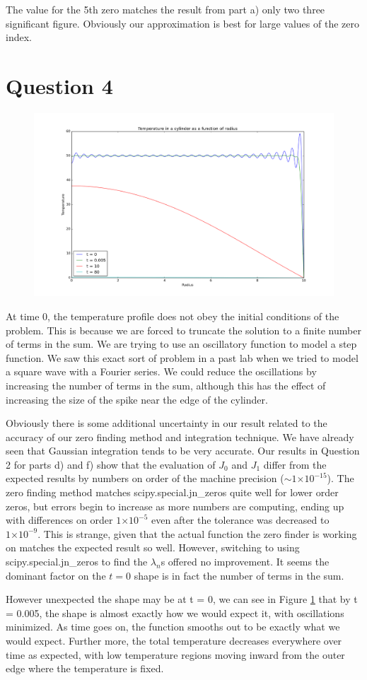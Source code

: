 \documentclass[a4paper,12pt]{article}
\providecommand{\e}[1]{\ensuremath{\times 10^{#1}}}
\begin{document}
The value for the 5th zero matches the result from part a) only two three significant figure. Obviously our approximation is best for large values of the zero index.

\section{Question 4} 

\begin{figure}[H]
\centering
\includegraphics[width = 0.8\linewidth]{indepq4.png}
\caption{}
\label{fig:q4}
\end{figure}

At time 0, the temperature profile does not obey the initial conditions of the problem. This is because we are forced to truncate the solution to a finite number of terms in the sum. We are trying to use an oscillatory function to model a step function. We saw this exact sort of problem in a past lab when we tried to model a square wave with a Fourier series. We could reduce the oscillations by increasing the number of terms in the sum, although this has the effect of increasing the size of the spike near the edge of the cylinder.

Obviously there is some additional uncertainty in our result related to the accuracy of our zero finding method and integration technique. We have already seen that Gaussian integration tends to be very accurate. Our results in Question 2 for parts d) and f) show that the evaluation of $J_0$ and $J_1$ differ from the expected results by numbers on order of the machine precision ($\sim 1\e{-15}$). The zero finding method matches scipy.special.jn\_zeros quite well for lower order zeros, but errors begin to increase as more numbers are computing, ending up with differences on order $1\e{-5}$ even after the tolerance was decreased to $1\e{-9}$. This is strange, given that the actual function the zero finder is working on matches the expected result so well. However, switching to using scipy.special.jn\_zeros to find the $\lambda_n$s offered no improvement. It seems the dominant factor on the $t = 0$ shape is in fact the number of terms in the sum.

However unexpected the shape may be at t = 0, we can see in Figure \ref{fig:q4} that by t = 0.005, the shape is almost exactly how we would expect it, with oscillations minimized. As time goes on, the function smooths out to be exactly what we would expect. Further more, the total temperature decreases everywhere over time as expected, with low temperature regions moving inward from the outer edge where the temperature is fixed.
\end{document}
